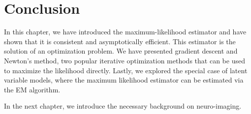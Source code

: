 \section{Conclusion}
In this chapter, we have introduced the maximum-likelihood estimator and have shown
that it is consistent and asymptotically efficient. This estimator is the
solution of an optimization problem. We have presented gradient descent and
Newton's method, two popular iterative optimization methods that can be used to
maximize the likelihood directly. Lastly, we explored the special case of latent variable models,
where the maximum likelihood estimator can be estimated via the EM algorithm.

In the next chapter, we introduce the necessary background on neuro-imaging.
